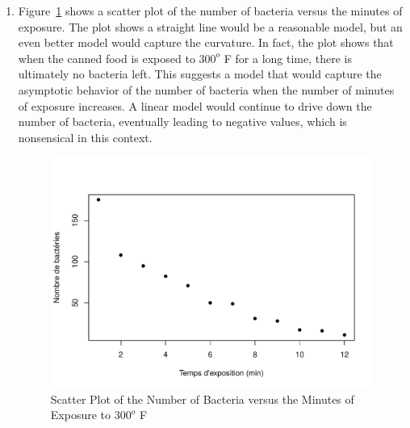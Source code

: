 \begin{solution}{2.22}
\begin{enumerate}
\item Figure~\ref{fig:simple:bact1} shows a scatter plot of the number of bacteria versus the minutes of exposure. The plot shows a straight line would be a reasonable model, but an even better model would capture the curvature. In fact, the plot shows that when the canned food is exposed to $300^{o}$ F for a long time, there is ultimately no bacteria left. This suggests a model that would capture the asymptotic behavior of the number of bacteria when the number of minutes of exposure increases. A linear model would continue to drive down the number of bacteria, eventually leading to negative values, which is nonsensical in this context.

\begin{figure}
\centering
\begin{knitrout}
\color{fgcolor}
\includegraphics[width=\maxwidth]{figure/unnamed-chunk-36-1}

\end{knitrout}
\caption{Scatter Plot of the Number of Bacteria versus the Minutes of Exposure to $300^{o}$ F}
\label{fig:simple:bact1}
\end{figure}


\end{enumerate}
\end{solution}
